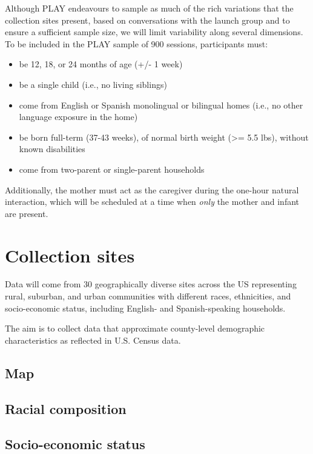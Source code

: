\documentclass[
  12pt,
]{book}
\providecommand{\tightlist}{%
  \setlength{\itemsep}{0pt}\setlength{\parskip}{0pt}}
\begin{document}
Although PLAY endeavours to sample as much of the rich variations that the collection sites present, based on conversations with the launch group and to ensure a sufficient sample size, we will limit variability along several dimensions. To be included in the PLAY sample of 900 sessions, participants must:

\begin{itemize}
\tightlist
\item
  be 12, 18, or 24 months of age (+/- 1 week)
\item
  be a single child (i.e., no living siblings)
\item
  come from English or Spanish monolingual or bilingual homes (i.e., no other language exposure in the home)
\item
  be born full-term (37-43 weeks), of normal birth weight (\textgreater= 5.5 lbs), without known disabilities
\item
  come from two-parent or single-parent households
\end{itemize}

Additionally, the mother must act as the caregiver during the one-hour natural interaction, which will be scheduled at a time when \emph{only} the mother and infant are present.

\hypertarget{collection-sites}{%
\section{Collection sites}\label{collection-sites}}

Data will come from 30 geographically diverse sites across the US representing rural, suburban, and urban communities with different races, ethnicities, and socio-economic status, including English- and Spanish-speaking households.

The aim is to collect data that approximate county-level demographic characteristics as reflected in U.S. Census data.

\hypertarget{map}{%
\subsection{Map}\label{map}}

\hypertarget{racial-composition}{%
\subsection{Racial composition}\label{racial-composition}}

\hypertarget{socio-economic-status}{%
\subsection{Socio-economic status}\label{socio-economic-status}}
\end{document}
